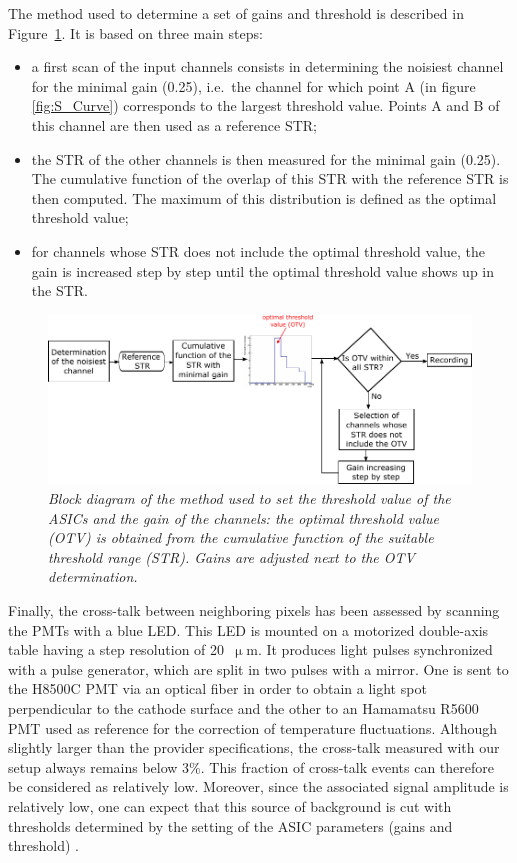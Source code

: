 \documentclass[a4paper,11pt]{article}
\begin{document}
The method used to determine a set of gains and threshold is described in Figure~\ref{fig:Simplified_algo}. It is based on three main steps:
\begin{itemize}
	\item a first scan of the input channels consists in determining the noisiest channel for the minimal gain (0.25), i.e.~the channel for which point A (in figure \ref{fig:S_Curve}) corresponds to the largest threshold value. Points A and B of this channel are then used as a reference STR;
	\item the STR of the other channels is then measured for the minimal gain (0.25). The cumulative function of the overlap of this STR with the reference STR is then computed. The maximum of this distribution is defined as the optimal threshold value;
	\item for channels whose STR does not include the optimal threshold value, the gain is increased step by step until the optimal threshold value shows up in the STR.
\end{itemize}

\begin{figure}[htb]
\centering
\includegraphics[width=\textwidth]{figures/Gains_Thr_Settings_Algo.pdf}
\caption{\small{\textit{Block diagram of the method used to set the threshold value of the ASICs and the gain of the channels: the optimal threshold value (OTV) is obtained from the cumulative function of the suitable threshold range (STR). Gains are adjusted next to the OTV determination.}}}
\label{fig:Simplified_algo}
\end{figure}

Finally, the cross-talk between neighboring pixels has been assessed by scanning the PMTs with a blue LED. This LED is mounted on a motorized double-axis table having a step resolution of 20~$\upmu$m. It produces light pulses synchronized with a pulse generator, which are split in two pulses with a mirror. One is sent to the H8500C PMT via an optical fiber in order to obtain a light spot perpendicular to the cathode surface and the other to an Hamamatsu R5600 PMT used as reference for the correction of temperature fluctuations. Although slightly larger than the provider specifications, the cross-talk measured with our setup always remains below 3\%. This fraction of cross-talk events can therefore be considered as relatively low. Moreover, since the associated signal amplitude is relatively low, one can expect that this source of background is cut with thresholds determined by the setting of the ASIC parameters (gains and threshold) \cite{FontanaPhD}.
\end{document}
